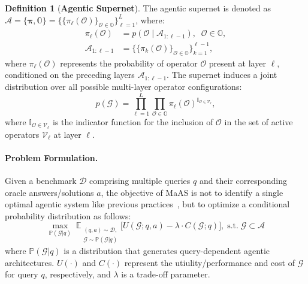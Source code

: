 \documentclass{article}
\theoremstyle{plain}
\theoremstyle{definition}
\newtheorem{definition}[theorem]{Definition}
\theoremstyle{remark}
\newcommand{\ourmethod}{{{MaAS}}\xspace}
\begin{document}
\begin{definition}[\textbf{Agentic Supernet}]
\label{def:supernet}
The agentic supernet is denoted as \(\mathcal{A} = \{\boldsymbol{\pi}, \mathbb{O}\}=\{\{\pi_{\ell}(\mathcal{O})\}_{\mathcal{O} \in \mathbb{O}}\}_{\ell=1}^L\), where:
\begin{equation}
\begin{aligned}
\pi_{\ell}(\mathcal{O}) &= p(\mathcal{O} \mid \mathcal{A}_{1:\ell-1}), \;\;\mathcal{O} \in \mathbb{O},\\
\mathcal{A}_{1:\ell-1} &= \{\{\pi_{k}(\mathcal{O})\}_{\mathcal{O} \in \mathbb{O}}\}_{k=1}^{\ell-1},
\end{aligned}
\end{equation}
where \(\pi_{\ell}(\mathcal{O})\) represents the probability of operator \(\mathcal{O}\) present at layer \(\ell\), conditioned on the preceding layers \(\mathcal{A}_{1:\ell-1}\).
The supernet induces a joint distribution over all possible multi-layer operator configurations:
\begin{equation}
p(\mathcal{G}) = \prod_{\ell=1}^L \prod_{\mathcal{O} \in \mathbb{O}} \pi_{\ell}(\mathcal{O})^{\mathbb{I}_{\mathcal{O} \in \mathcal{V}_\ell}},
\end{equation}
where \(\mathbb{I}_{\mathcal{O} \in \mathcal{V}_\ell}\) is the indicator function for the inclusion of \(\mathcal{O}\) in the set of active operators \(\mathcal{V}_\ell\) at layer \(\ell\).
\end{definition}

\vspace{-0.6em}
\paragraph{Problem Formulation.} Given a benchmark $\mathcal{D}$ comprising multiple queries $q$ and their corresponding oracle answers/solutions $a$, the objective of \ourmethod is not to identify a single optimal agentic system like previous practices~\citep{zhang2024aflow,zhuge2024gptswarm}, but to optimize a conditional probability distribution as follows:  
\begin{equation}  
 \underset{\mathbb{P}(\mathcal{G} | q)}{\max}\; \mathbb{E}_{\substack{(q,a) \sim \mathcal{D}, \\\mathcal{G} \sim \mathbb{P}(\mathcal{G} | q)}} \big[ U(\mathcal{G}; q,a) - \lambda \cdot C(\mathcal{G}; q) \big],\; \text{s.t.}\;\mathcal{G}\subset\mathcal{A}  
\end{equation}  
where $\mathbb{P}(\mathcal{G} | q)$ is a distribution that generates query-dependent agentic architectures. $U(\cdot)$ and $C(\cdot)$ represent the utiulity/performance and cost of $\mathcal{G}$ for query $q$, respectively, and $\lambda$ is a trade-off parameter.
\end{document}
